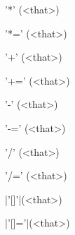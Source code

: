 \begin{urbiscriptapi}
\item['*'](<that>)%
\begin{urbiassert}

\end{urbiassert}

\item['*='](<that>)%
\begin{urbiassert}

\end{urbiassert}

\item['+'](<that>)%
\begin{urbiassert}

\end{urbiassert}

\item['+='](<that>)%
\begin{urbiassert}

\end{urbiassert}

\item['-'](<that>)%
\begin{urbiassert}

\end{urbiassert}

\item['-='](<that>)%
\begin{urbiassert}

\end{urbiassert}

\item['/'](<that>)%
\begin{urbiassert}

\end{urbiassert}

\item['/='](<that>)%
\begin{urbiassert}

\end{urbiassert}

\item|'[]'|(<that>)%
\begin{urbiassert}

\end{urbiassert}

\item|'[]='|(<that>)%
\begin{urbiassert}

\end{urbiassert}
\end{urbiscriptapi}

